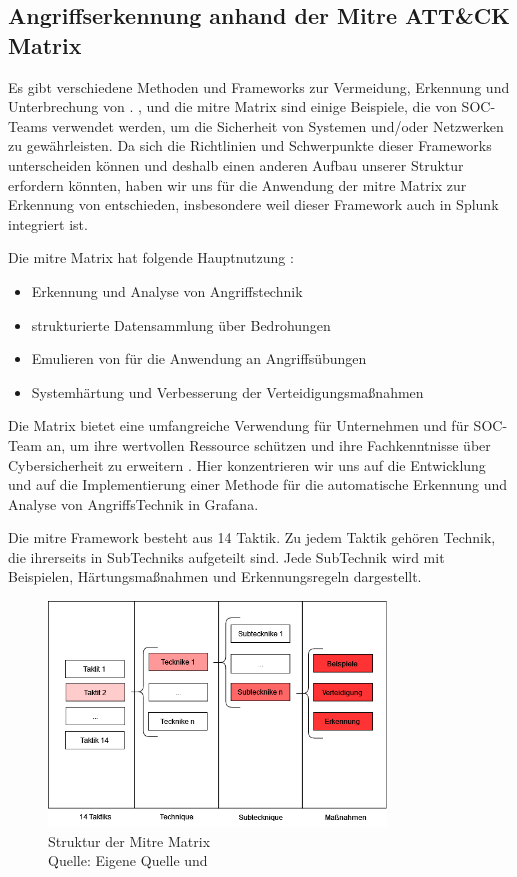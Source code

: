 \subsection{Angriffserkennung anhand der Mitre ATT\&CK Matrix\textregistered}
Es gibt verschiedene Methoden und Frameworks zur Vermeidung, Erkennung und Unterbrechung von . ,  und die \gls{mitre} Matrix sind einige Beispiele, die von \gls{SOC}-Teams verwendet werden, um die Sicherheit von Systemen und/oder Netzwerken zu gewährleisten. Da sich die Richtlinien und Schwerpunkte dieser Frameworks unterscheiden können und deshalb einen anderen Aufbau unserer Struktur erfordern könnten, haben wir uns für die Anwendung der \gls{mitre} Matrix zur Erkennung von  entschieden, insbesondere weil dieser Framework auch in Splunk integriert ist.

Die \gls{mitre} Matrix hat folgende Hauptnutzung \citep{Mitre_Started}:

{
\begin{itemize}[noitemsep]
   \item Erkennung und Analyse von Angriffstechnik
   \item	strukturierte Datensammlung über Bedrohungen
   \item	Emulieren von  für die Anwendung an Angriffsübungen
   \item	Systemhärtung und Verbesserung der Verteidigungsmaßnahmen
\end{itemize}
}

Die Matrix bietet eine umfangreiche Verwendung für Unternehmen und für \gls{SOC}-Team an, um ihre wertvollen Ressource schützen und ihre Fachkenntnisse über \gls{Cybersicherheit} zu erweitern \citep{Hazel_howtousemitre}. Hier konzentrieren wir uns auf die Entwicklung und auf die Implementierung einer Methode für die automatische Erkennung und Analyse von AngriffsTechnik in Grafana.

\newpage
Die \gls{mitre} Framework besteht aus 14 Taktik. Zu jedem Taktik gehören Technik, die ihrerseits in SubTechniks aufgeteilt sind. Jede SubTechnik wird mit Beispielen, Härtungsmaßnahmen und Erkennungsregeln dargestellt.

\begin{figure}[H]
   \centering
   \includegraphics[width=0.8\textwidth]{assets/Mitre_structure.drawio.png}
   \caption{Struktur der Mitre Matrix \\Quelle: Eigene Quelle und \citep{Mitre_Started}}
   \centering
\end{figure}

